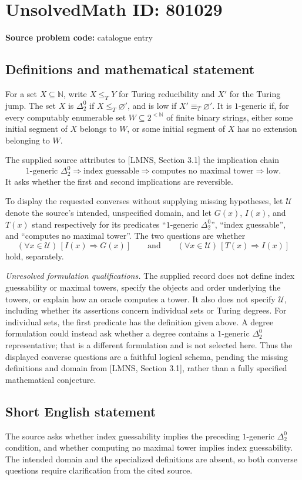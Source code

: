\documentclass[11pt]{article}
\newcommand{\N}{\mathbb{N}}
\begin{document}
\section*{UnsolvedMath ID: 801029}
\textbf{Source problem code:} catalogue entry
\subsection{Definitions and mathematical statement}
For a set \(X\subseteq\N\), write \(X\leq_T Y\) for Turing reducibility and \(X'\) for the Turing jump. The set \(X\) is \(\Delta^0_2\) if \(X\leq_T\varnothing'\), and is low if \(X'\equiv_T\varnothing'\). It is \(1\)-generic if, for every computably enumerable set \(W\subseteq 2^{<\N}\) of finite binary strings, either some initial segment of \(X\) belongs to \(W\), or some initial segment of \(X\) has no extension belonging to \(W\).

The supplied source attributes to [LMNS, Section 3.1] the implication chain
\[
\text{\(1\)-generic \(\Delta^0_2\)}
\Longrightarrow \text{index guessable}
\Longrightarrow \text{computes no maximal tower}
\Longrightarrow \text{low}.
\]
It asks whether the first and second implications are reversible.

To display the requested converses without supplying missing hypotheses, let \(\mathcal U\) denote the source's intended, unspecified domain, and let \(G(x)\), \(I(x)\), and \(T(x)\) stand respectively for its predicates ``\(1\)-generic \(\Delta^0_2\)'', ``index guessable'', and ``computes no maximal tower''. The two questions are whether
\[
(\forall x\in\mathcal U)\,[I(x)\Longrightarrow G(x)]
\qquad\text{and}\qquad
(\forall x\in\mathcal U)\,[T(x)\Longrightarrow I(x)]
\]
hold, separately.

\emph{Unresolved formulation qualifications.} The supplied record does not define index guessability or maximal towers, specify the objects and order underlying the towers, or explain how an oracle computes a tower. It also does not specify \(\mathcal U\), including whether its assertions concern individual sets or Turing degrees. For individual sets, the first predicate has the definition given above. A degree formulation could instead ask whether a degree contains a \(1\)-generic \(\Delta^0_2\) representative; that is a different formulation and is not selected here. Thus the displayed converse questions are a faithful logical schema, pending the missing definitions and domain from [LMNS, Section 3.1], rather than a fully specified mathematical conjecture.
\subsection{Short English statement}
The source asks whether index guessability implies the preceding \(1\)-generic \(\Delta^0_2\) condition, and whether computing no maximal tower implies index guessability. The intended domain and the specialized definitions are absent, so both converse questions require clarification from the cited source.
\end{document}
